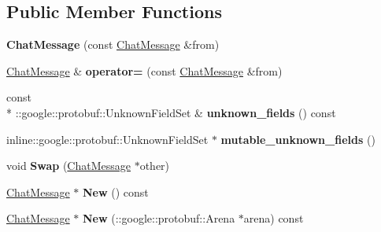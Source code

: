 \subsection*{Public Member Functions}
\begin{DoxyCompactItemize}
\item 
\hypertarget{classSimpleChat_1_1ChatMessage_a231f5e8f74e136753ca49ea5ca9ae51f}{{\bfseries Chat\-Message} (const \hyperlink{classSimpleChat_1_1ChatMessage}{Chat\-Message} \&from)}\label{classSimpleChat_1_1ChatMessage_a231f5e8f74e136753ca49ea5ca9ae51f}

\item 
\hypertarget{classSimpleChat_1_1ChatMessage_ade94e82145002b81dfa9e2f35855084f}{\hyperlink{classSimpleChat_1_1ChatMessage}{Chat\-Message} \& {\bfseries operator=} (const \hyperlink{classSimpleChat_1_1ChatMessage}{Chat\-Message} \&from)}\label{classSimpleChat_1_1ChatMessage_ade94e82145002b81dfa9e2f35855084f}

\item 
\hypertarget{classSimpleChat_1_1ChatMessage_a261d1bfeea73eb6eb16ecaf27d770be1}{const \\*
\-::google\-::protobuf\-::\-Unknown\-Field\-Set \& {\bfseries unknown\-\_\-fields} () const }\label{classSimpleChat_1_1ChatMessage_a261d1bfeea73eb6eb16ecaf27d770be1}

\item 
\hypertarget{classSimpleChat_1_1ChatMessage_a6ddd70adfef9a10e694f12350ae29382}{inline\-::google\-::protobuf\-::\-Unknown\-Field\-Set $\ast$ {\bfseries mutable\-\_\-unknown\-\_\-fields} ()}\label{classSimpleChat_1_1ChatMessage_a6ddd70adfef9a10e694f12350ae29382}

\item 
\hypertarget{classSimpleChat_1_1ChatMessage_a8d7cf0c94da9a697d77641dfd9a17310}{void {\bfseries Swap} (\hyperlink{classSimpleChat_1_1ChatMessage}{Chat\-Message} $\ast$other)}\label{classSimpleChat_1_1ChatMessage_a8d7cf0c94da9a697d77641dfd9a17310}

\item 
\hypertarget{classSimpleChat_1_1ChatMessage_a0837c7d0ab99ab83af09f4d695c5fa2b}{\hyperlink{classSimpleChat_1_1ChatMessage}{Chat\-Message} $\ast$ {\bfseries New} () const }\label{classSimpleChat_1_1ChatMessage_a0837c7d0ab99ab83af09f4d695c5fa2b}

\item 
\hypertarget{classSimpleChat_1_1ChatMessage_a8bfb7e74e37956c08734a8ad0e165746}{\hyperlink{classSimpleChat_1_1ChatMessage}{Chat\-Message} $\ast$ {\bfseries New} (\-::google\-::protobuf\-::\-Arena $\ast$arena) const }\label{classSimpleChat_1_1ChatMessage_a8bfb7e74e37956c08734a8ad0e165746}


\end{DoxyCompactItemize}

